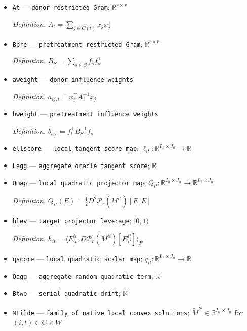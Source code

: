 \documentclass{article}
\begin{document}
\begin{itemize}
  \par\smallskip\noindent\emph{Definition.} \(E^{it}_{ju}\) is the canonical basis matrix with one in local coordinate \((j,u)\) and zero elsewhere in the fixed ordered local space
  \item \texttt{At} --- \texttt{donor restricted Gram}; \(\mathbb R^{r\times r}\)
  \par\smallskip\noindent\emph{Definition.} \(A_t=\sum_{j\in C(t)}x_jx_j^{\top}\)
  \item \texttt{Bpre} --- \texttt{pretreatment restricted Gram}; \(\mathbb R^{r\times r}\)
  \par\smallskip\noindent\emph{Definition.} \(B_S=\sum_{s\in S}f_sf_s^{\top}\)
  \item \texttt{aweight} --- \texttt{donor influence weights}
  \par\smallskip\noindent\emph{Definition.} \(a_{ij,t}=x_i^{\top}A_t^{-1}x_j\)
  \item \texttt{bweight} --- \texttt{pretreatment influence weights}
  \par\smallskip\noindent\emph{Definition.} \(b_{t,s}=f_t^{\top}B_S^{-1}f_s\)
  \item \texttt{ellscore} --- \texttt{local tangent-\allowbreak{}score map}; \(\ell_{it}:\mathbb R^{I_{it}\times J_{it}}\to\mathbb R\)
  \item \texttt{Lagg} --- \texttt{aggregate oracle tangent score}; \(\mathbb R\)
  \item \texttt{Qmap} --- \texttt{local quadratic projector map}; \(Q_{it}:\mathbb R^{I_{it}\times J_{it}}\to\mathbb R^{I_{it}\times J_{it}}\)
  \par\smallskip\noindent\emph{Definition.} \(Q_{it}(E)=\tfrac12D^2\mathcal P_r(M^{it})[E,E]\)
  \item \texttt{hlev} --- \texttt{target projector leverage}; \([0,1)\)
  \par\smallskip\noindent\emph{Definition.} \(h_{it}=\langle E^{it}_{it},D\mathcal P_r(M^{it})[E^{it}_{it}]\rangle_F\)
  \item \texttt{qscore} --- \texttt{local quadratic scalar map}; \(q_{it}:\mathbb R^{I_{it}\times J_{it}}\to\mathbb R\)
  \item \texttt{Qagg} --- \texttt{aggregate random quadratic term}; \(\mathbb R\)
  \item \texttt{Btwo} --- \texttt{serial quadratic drift}; \(\mathbb R\)
  \item \texttt{Mtilde} --- \texttt{family of native local convex solutions}; \(\widetilde M^{it}\in\mathbb R^{I_{it}\times J_{it}}\) for \((i,t)\in G\times W\)

\end{itemize}
\end{document}
